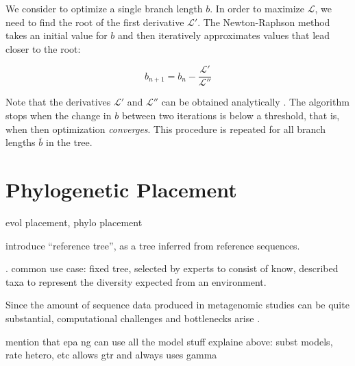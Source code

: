 We consider to optimize a single branch length $b$.
In order to maximize $\mathcal{L}$, we need to find the root of the first derivative $\mathcal{L}'$.
The Newton-Raphson method takes an initial value for $b$ and then
iteratively approximates values that lead closer to the root:

\begin{equation}
    \label{ch:Foundations:sec:MLTreeInference:eq:BLO}
    b_{n+1} = b_n - \frac{ \mathcal{L}' }{ \mathcal{L}'' }
\end{equation}

Note that the derivatives $\mathcal{L}'$ and $\mathcal{L}''$ can be obtained analytically \cite{Yang2014}.
The algorithm stops when the change in $b$ between two iterations is below a threshold,
that is, when then optimization \emph{converges}.
This procedure is repeated for all branch lengths $\bar{b}$ in the tree.


\section{Phylogenetic Placement}
\label{ch:Foundations:sec:PhylogeneticPlacement}

evol placement, phylo placement \cite{Matsen2010,Berger2011,Barbera2018}

introduce ``reference tree'', as a tree inferred from reference sequences.

. common use case: fixed tree, selected by experts to consist of know, described taxa
to represent the diversity expected from an environment.


Since the amount of sequence data produced in metagenomic studies can be quite substantial,
computational challenges and bottlenecks arise \cite{Scholz2012}.


mention that epa ng can use all the model stuff explaine above: subst models, rate hetero, etc
allows gtr and always uses gamma


